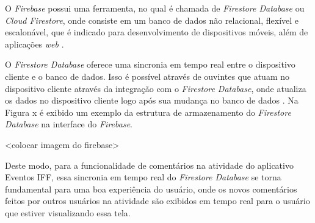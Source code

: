 O \textit{Firebase} possui uma ferramenta, no qual é chamada de \textit{Firestore Database} ou \textit{Cloud Firestore}, onde consiste em um banco de dados não relacional, flexível e escalonável, que é indicado para desenvolvimento de dispositivos móveis, além de aplicações \textit{web} \cite{google_firebase}.

O \textit{Firestore Database} oferece uma sincronia em tempo real entre o dispositivo cliente e o banco de dados. Isso é possível através de ouvintes que atuam no dispositivo cliente através da integração com o \textit{Firestore Database}, onde atualiza os dados no dispositivo cliente logo após sua mudança no banco de dados \cite{google_firebase}. Na Figura x é exibido um exemplo da estrutura de armazenamento do \textit{Firestore Database} na interface do \textit{Firebase}.

<colocar imagem do firebase>

Deste modo, para a funcionalidade de comentários na atividade do aplicativo Eventos IFF, essa sincronia em tempo real do \textit{Firestore Database} se torna fundamental para uma boa experiência do usuário, onde os novos comentários feitos por outros usuários na atividade são exibidos em tempo real para o usuário que estiver visualizando essa tela.